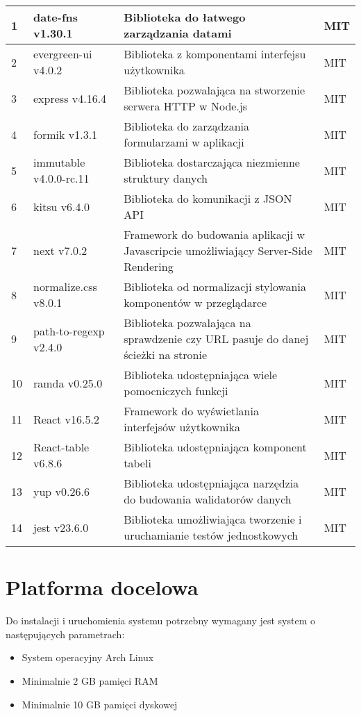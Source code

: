 \documentclass[a4paper,11pt,twoside]{report}
\theoremstyle{definition}
\begin{document}
\begin{center}
\begin{longtable}{| p{} | p{} | p{} | p{} |}
        		1 & date-fns v1.30.1 & Biblioteka do łatwego zarządzania datami & MIT \\ \hline
        		2 & evergreen-ui v4.0.2 & Biblioteka z komponentami interfejsu użytkownika & MIT \\ \hline
        		3 & express v4.16.4 & Biblioteka pozwalająca na stworzenie serwera HTTP w Node.js & MIT \\ \hline
        		4 & formik v1.3.1 & Biblioteka do zarządzania formularzami w aplikacji & MIT \\ \hline
        		5 & immutable v4.0.0-rc.11 & Biblioteka dostarczająca niezmienne struktury danych & MIT \\ \hline
        		6 & kitsu v6.4.0 & Biblioteka do komunikacji z JSON API & MIT \\ \hline
        		7 & next v7.0.2 & Framework do budowania aplikacji w Javascripcie umożliwiający Server-Side Rendering & MIT \\ \hline
        		8 & normalize.css v8.0.1 & Biblioteka od normalizacji stylowania komponentów w przeglądarce & MIT \\ \hline
        		9 & path-to-regexp v2.4.0 & Biblioteka pozwalająca na sprawdzenie czy URL pasuje do danej ścieżki na stronie & MIT \\ \hline
        		10 & ramda v0.25.0 & Biblioteka udostępniająca wiele pomocniczych funkcji & MIT \\ \hline
        		11 & React v16.5.2 & Framework do wyświetlania interfejsów użytkownika & MIT \\ \hline
        		12 & React-table v6.8.6 & Biblioteka udostępniająca komponent tabeli & MIT \\ \hline
        		13 & yup v0.26.6 & Biblioteka udostępniająca narzędzia do budowania walidatorów danych & MIT \\ \hline
        		14 & jest v23.6.0 & Biblioteka umożliwiająca tworzenie i uruchamianie testów jednostkowych & MIT \\ \hline
        	\end{longtable}
        \end{center}
    
    \section{Platforma docelowa}
		Do instalacji i uruchomienia systemu potrzebny wymagany jest system o następujących parametrach:
		
		\begin{itemize}
			\item System operacyjny Arch Linux 
			\item Minimalnie 2 GB pamięci RAM
			\item Minimalnie 10 GB pamięci dyskowej
		\end{itemize}
		
\end{document}
